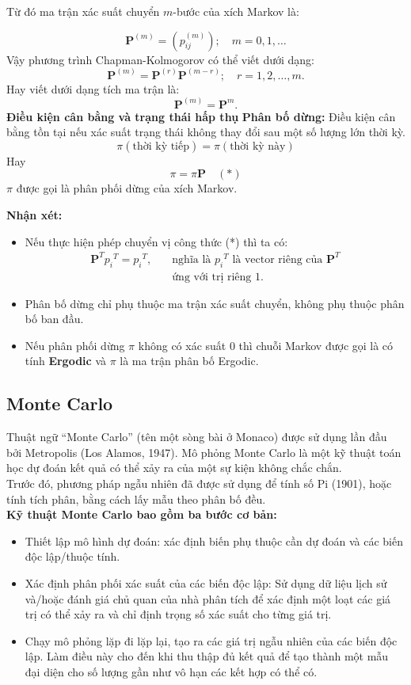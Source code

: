 \documentclass[conference]{IEEEtran}
\begin{document}
\noindent Từ đó ma trận xác suất chuyển \(m\)-bước của xích Markov là:

\[
\mathbf{P}^{(m)} = \left( p_{ij}^{(m)} \right); \quad m = 0,1, \dots
\]
\noindent Vậy phương trình Chapman-Kolmogorov có thể viết dưới dạng:
\[
\mathbf{P}^{(m)} = \mathbf{P}^{(r)} \mathbf{P}^{(m-r)}; \quad r = 1, 2, \dots, m.
\]
\noindent Hay viết dưới dạng tích ma trận là:
\[
\mathbf{P}^{(m)} = \mathbf{P}^m.
\] 
\textbf{Điều kiện cân bằng và trạng thái hấp thụ}
\indent \textbf{Phân bố dừng:} Điều kiện cân bằng tồn tại nếu xác suất trạng thái không thay đổi sau một số lượng lớn thời kỳ.
\[
\pi (\text{thời kỳ tiếp}) = \pi (\text{thời kỳ này})
\]
Hay
\[
\pi = \pi \mathbf{P} \quad (*)
\]
\(\pi\) được gọi là phân phối dừng của xích Markov.

\textbf{Nhận xét:}
\begin{itemize}
    \item Nếu thực hiện phép chuyển vị công thức (*) thì ta có:
    \begin{align*}
    \mathbf{P}^{T} {p_i}^{T} = {p_i}^{T}, \quad &\text{nghĩa là } {p_i}^{T} \text{ là vector riêng của } \mathbf{P}^{T} \\
    &\text{ứng với trị riêng } 1.
    \end{align*}
    \item Phân bố dừng chỉ phụ thuộc ma trận xác suất chuyển, không phụ thuộc phân bố ban đầu.
    \item Nếu phân phối dừng \(\pi\) không có xác suất 0 thì chuỗi Markov được gọi là có tính \textbf{Ergodic} và \(\pi\) là ma trận phân bố Ergodic.
\end{itemize}
\subsection{Monte Carlo}
Thuật ngữ “Monte Carlo” (tên một sòng bài ở Monaco) được sử dụng lần đầu bởi Metropolis (Los Alamos, 1947). Mô phỏng Monte Carlo là một kỹ thuật toán học dự đoán kết quả có thể xảy ra của một sự kiện không chắc chắn.
\\
\indent Trước đó, phương pháp ngẫu nhiên đã được sử dụng để tính số Pi (1901), hoặc tính tích phân, bằng cách lấy mẫu theo phân bố đều.
\\
\textbf{Kỹ thuật Monte Carlo bao gồm ba bước cơ bản:}

\begin{itemize}
    \item Thiết lập mô hình dự đoán: xác định biến phụ thuộc cần dự đoán và các biến độc lập/thuộc tính.
    
    \item Xác định phân phối xác suất của các biến độc lập: Sử dụng dữ liệu lịch sử và/hoặc đánh giá chủ quan của nhà phân tích để xác định một loạt các giá trị có thể xảy ra và chỉ định trọng số xác suất cho từng giá trị.
    
    \item Chạy mô phỏng lặp đi lặp lại, tạo ra các giá trị ngẫu nhiên của các biến độc lập. Làm điều này cho đến khi thu thập đủ kết quả để tạo thành một mẫu đại diện cho số lượng gần như vô hạn các kết hợp có thể có.
\end{itemize}
\end{document}
